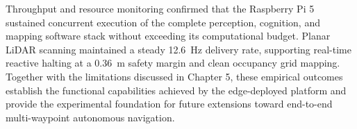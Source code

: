 Throughput and resource monitoring confirmed that the Raspberry Pi 5 sustained concurrent execution of the complete perception, cognition, and mapping software stack without exceeding its computational budget. Planar LiDAR scanning maintained a steady 12.6~Hz delivery rate, supporting real-time reactive halting at a 0.36~m safety margin and clean occupancy grid mapping. Together with the limitations discussed in Chapter 5, these empirical outcomes establish the functional capabilities achieved by the edge-deployed platform and provide the experimental foundation for future extensions toward end-to-end multi-waypoint autonomous navigation.

